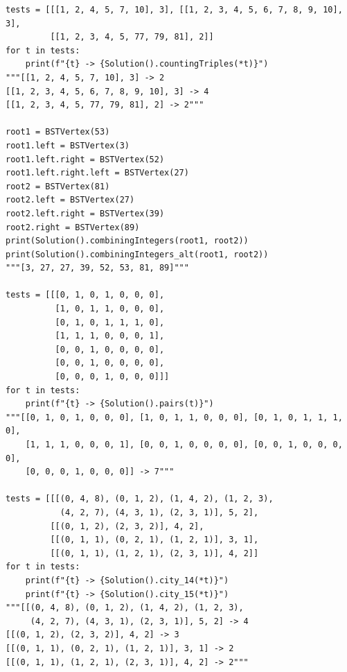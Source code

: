 \documentclass[12pt]{article}
\begin{document}
\begin{verbatim}
tests = [[[1, 2, 4, 5, 7, 10], 3], [[1, 2, 3, 4, 5, 6, 7, 8, 9, 10], 3],
         [[1, 2, 3, 4, 5, 77, 79, 81], 2]]
for t in tests:
    print(f"{t} -> {Solution().countingTriples(*t)}")
"""[[1, 2, 4, 5, 7, 10], 3] -> 2
[[1, 2, 3, 4, 5, 6, 7, 8, 9, 10], 3] -> 4
[[1, 2, 3, 4, 5, 77, 79, 81], 2] -> 2"""

root1 = BSTVertex(53)
root1.left = BSTVertex(3)
root1.left.right = BSTVertex(52)
root1.left.right.left = BSTVertex(27)
root2 = BSTVertex(81)
root2.left = BSTVertex(27)
root2.left.right = BSTVertex(39)
root2.right = BSTVertex(89)
print(Solution().combiningIntegers(root1, root2))
print(Solution().combiningIntegers_alt(root1, root2))
"""[3, 27, 27, 39, 52, 53, 81, 89]"""

tests = [[[0, 1, 0, 1, 0, 0, 0],
          [1, 0, 1, 1, 0, 0, 0],
          [0, 1, 0, 1, 1, 1, 0],
          [1, 1, 1, 0, 0, 0, 1],
          [0, 0, 1, 0, 0, 0, 0],
          [0, 0, 1, 0, 0, 0, 0],
          [0, 0, 0, 1, 0, 0, 0]]]
for t in tests:
    print(f"{t} -> {Solution().pairs(t)}")
"""[[0, 1, 0, 1, 0, 0, 0], [1, 0, 1, 1, 0, 0, 0], [0, 1, 0, 1, 1, 1, 0],
    [1, 1, 1, 0, 0, 0, 1], [0, 0, 1, 0, 0, 0, 0], [0, 0, 1, 0, 0, 0, 0],
    [0, 0, 0, 1, 0, 0, 0]] -> 7"""

tests = [[[(0, 4, 8), (0, 1, 2), (1, 4, 2), (1, 2, 3),
           (4, 2, 7), (4, 3, 1), (2, 3, 1)], 5, 2],
         [[(0, 1, 2), (2, 3, 2)], 4, 2],
         [[(0, 1, 1), (0, 2, 1), (1, 2, 1)], 3, 1],
         [[(0, 1, 1), (1, 2, 1), (2, 3, 1)], 4, 2]]
for t in tests:
    print(f"{t} -> {Solution().city_14(*t)}")
    print(f"{t} -> {Solution().city_15(*t)}")
"""[[(0, 4, 8), (0, 1, 2), (1, 4, 2), (1, 2, 3),
     (4, 2, 7), (4, 3, 1), (2, 3, 1)], 5, 2] -> 4
[[(0, 1, 2), (2, 3, 2)], 4, 2] -> 3
[[(0, 1, 1), (0, 2, 1), (1, 2, 1)], 3, 1] -> 2
[[(0, 1, 1), (1, 2, 1), (2, 3, 1)], 4, 2] -> 2"""
\end{verbatim}
\end{document}
